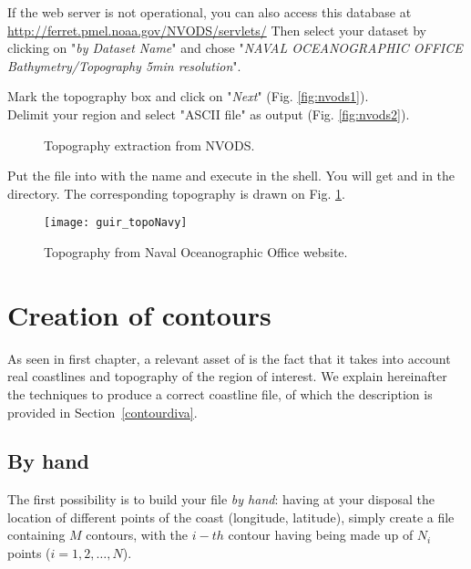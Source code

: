 If the web server is not operational, you can also access this database at \url{http://ferret.pmel.noaa.gov/NVODS/servlets/}
Then select your dataset by clicking on "\textsl{by Dataset Name}" and chose 
"\textsl{NAVAL OCEANOGRAPHIC OFFICE Bathymetry/Topography 5min resolution}".

Mark the topography box and click on "\textsl{Next}" (Fig. \ref{fig:nvods1}).\\
Delimit your region and select "ASCII file" as output (Fig. \ref{fig:nvods2}). 


\begin{figure}[htpb]
\centering
{}

\caption{Topography extraction from NVODS.}
\end{figure}


Put the  file into  with the name  and execute  in the shell. You will get  and  in the  directory. The corresponding topography is drawn on Fig. \ref{fig:topoNaval}.


\begin{figure}[htpb]
\centering
\texttt{[image: guir\_topoNavy]}
\caption{Topography from Naval Oceanographic Office website.\label{fig:topoNaval}}
\end{figure}




\section{Creation of contours\label{sec:contourgen}}

As seen in first chapter, a relevant asset of \diva is the fact that it takes into account real coastlines and topography of the region of interest. We explain hereinafter the techniques to produce a correct coastline file, of which the description is provided in Section~\ref{contourdiva}.


\subsection{By hand}

The first possibility is to build your file \textit{by hand}: having at your disposal the location of different points of the coast (longitude, latitude), simply create a file containing $M$ contours, with the $i-th$ contour having being made up of $N_{i}$ points ($i=1,2,\ldots, N$). 

